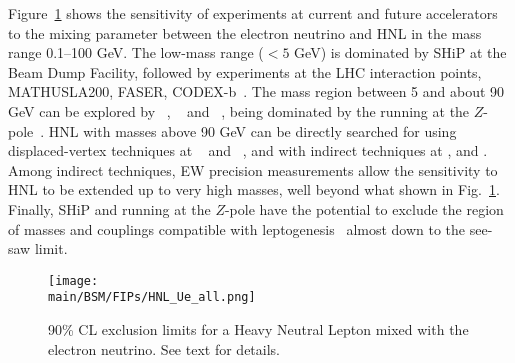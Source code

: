 \documentclass[../report.tex]{subfiles}
\providecommand{\main}{..}
\begin{document}
Figure~\ref{fig:FIPs-HNL} shows the sensitivity of experiments at current and future accelerators to the mixing parameter between the electron neutrino and HNL
in the mass range 0.1--100 GeV. The low-mass range ($< 5$ GeV) is dominated by SHiP at the Beam Dump Facility, followed by experiments at the LHC interaction points, MATHUSLA200, FASER, CODEX-b~\cite{Beacham:2019nyx}. The mass region between 5 and about 90 GeV can be explored by \ILC~\cite{Antusch:2017pkq}, \CEPC~\cite{CEPCStudyGroup:2018ghi} and \FCCeh~\cite{Abada:2019zxq}, being dominated by the \FCCee running at the $Z$-pole~\cite{Abada:2019zxq}.
HNL with masses above 90 GeV can be directly searched for using displaced-vertex techniques at \FCCeh~\cite{Abada:2019zxq} and \FCChh~\cite{Antusch:2016ejd}, and with indirect techniques at \FCCee, \CEPC and \ILC. Among indirect techniques, EW precision measurements allow the sensitivity to HNL to be extended up to very high masses, well beyond what shown in Fig.~\ref{fig:FIPs-HNL}. Finally, SHiP and \FCCee running at the $Z$-pole have the potential to exclude the region of masses and couplings compatible with leptogenesis~\cite{Eijima:2018qke} almost down to the see-saw limit. 

\begin{figure}[htb]
    \centering
    \texttt{[image: \\main/BSM/FIPs/HNL\_Ue\_all.png]}
    \caption{90\% CL exclusion limits for a Heavy Neutral Lepton mixed with the electron neutrino. See text for details.
    }
    \label{fig:FIPs-HNL}
\end{figure}
%
\end{document}
